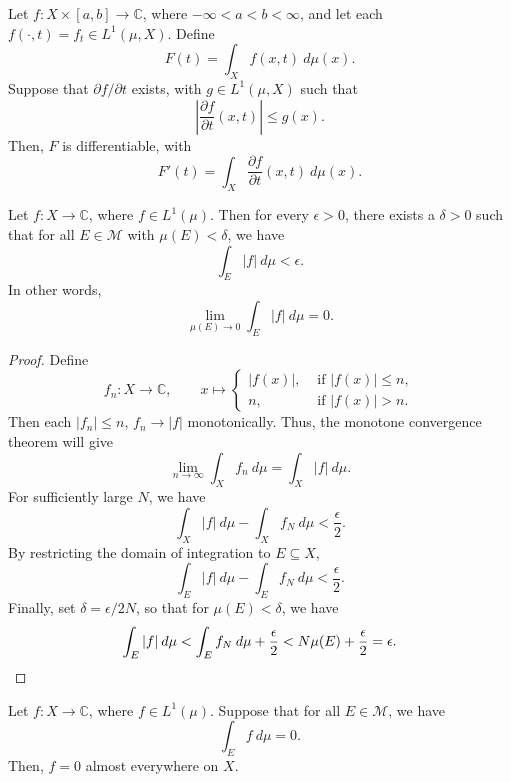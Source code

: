 \documentclass[11pt]{article}
\newcommand{\C}{\mathbb{C}}
\newcommand{\M}{\mathcal{M}}
\newcommand{\pp}[2]{\frac{\partial #1}{\partial #2}}
\theoremstyle{definition}
\theoremstyle{remark}
\numberwithin{equation}{section}
\begin{document}
    \begin{theorem}
        Let $f\colon X \times [a, b] \to \C$, where $-\infty < a < b < \infty$, and
        let each $f(\cdot, t) = f_t \in L^1(\mu, X)$. Define \[
            F(t) = \int_X f(x, t)\:d\mu(x).
        \] Suppose that $\partial f / \partial t$ exists, with $g \in L^1(\mu, X)$
        such that \[
            \left|\pp{f}{t}(x, t)\right| \leq g(x).
        \] Then, $F$ is differentiable, with \[
            F'(t) = \int_X \pp{f}{t}(x, t)\:d\mu(x).
        \] 
    \end{theorem}

    \begin{theorem}
        Let $f\colon X \to \C$, where $f \in L^1(\mu)$. Then for every $\epsilon >
        0$, there exists a $\delta > 0$ such that for all $E \in \M$ with $\mu(E) <
        \delta$, we have \[
            \int_E |f|\:d\mu < \epsilon.
        \] In other words, \[
            \lim_{\mu(E) \to 0} \int_E |f|\:d\mu = 0.
        \] 
    \end{theorem}
    \begin{proof}
        Define \[
            f_n\colon X \to \C, \qquad x \mapsto \begin{cases}
                |f(x)|, &\text{ if } |f(x)| \leq n, \\
                n, &\text{ if } |f(x)| > n.
            \end{cases}
        \] Then each $|f_n| \leq n$, $f_n \to |f|$ monotonically. Thus, the monotone
        convergence theorem will give \[
            \lim_{n \to \infty} \int_X f_n \:d\mu = \int_X |f|\:d\mu.
        \] For sufficiently large $N$, we have \[
            \int_X |f|\:d\mu - \int_X f_N\:d\mu < \frac{\epsilon}{2}.
        \] By restricting the domain of integration to $E \subseteq X$, \[
            \int_E |f|\:d\mu - \int_E f_N \:d\mu < \frac{\epsilon}{2}.
        \] Finally, set $\delta = \epsilon / 2N$, so that for $\mu(E) < \delta$, we
        have \[
            \int_E |f|\:d\mu < \int_E f_N\:d\mu + \frac{\epsilon}{2} < N\mu(E) +
            \frac{\epsilon}{2} = \epsilon. \qedhere
        \] 
    \end{proof}

    \begin{theorem}
        Let $f\colon X \to \C$, where $f \in L^1(\mu)$. Suppose that for all $E \in
        \M$, we have \[
             \int_E f\:d\mu = 0.
        \] Then, $f = 0$ almost everywhere on $X$.
    \end{theorem}
\end{document}
